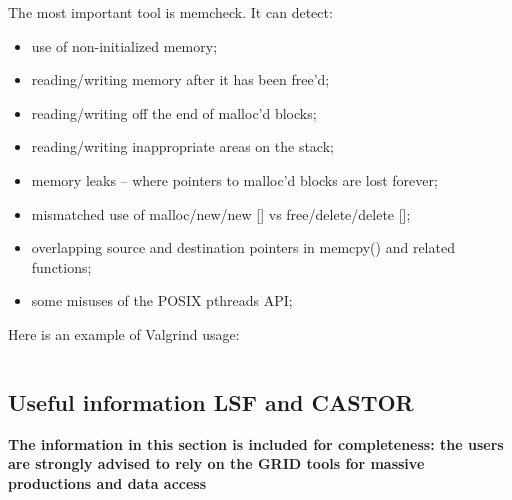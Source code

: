 \documentclass[12pt,a4paper,twoside]{article}
\begin{document}
The most important tool is memcheck. It can detect:
\begin{itemize}
\item use of non-initialized memory;
\item reading/writing memory after it has been free'd;
\item reading/writing off the end of malloc'd blocks;
\item reading/writing inappropriate areas on the stack;
\item memory leaks -- where pointers to malloc'd blocks are lost forever;
\item mismatched use of malloc/new/new [] vs free/delete/delete [];
\item overlapping source and destination pointers in memcpy() and
  related functions;
\item some misuses of the POSIX pthreads API;
\end{itemize}

Here is an example of Valgrind  usage:

\begin{lstlisting}[language=sh]
  % valgrind --tool=addrcheck --error-limit=no aliroot -b -q sim.C
\end{lstlisting}

%

\subsection{Useful information LSF and CASTOR}

\textbf{The information in this section is included for completeness: the
  users are strongly advised to rely on the GRID tools for massive
  productions and data access}
\end{document}

